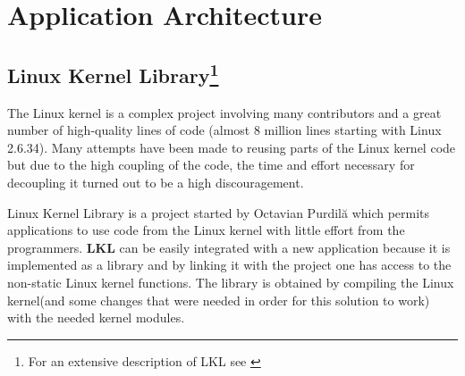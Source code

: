 \chapter{Application Architecture}
\label{chapter:arch}

\section[Linux Kernel Library]{Linux Kernel Library\footnote{For an extensive description of LKL see \cite{thesis}}}
\label{sec:lkl}

The Linux kernel is a complex project involving many contributors and a great number of high-quality lines 
of code (almost 8 million lines starting with Linux 2.6.34). Many attempts have been made to reusing parts of 
the Linux kernel code but due to the high coupling of the code, the time and effort necessary for decoupling 
it turned out to be a high discouragement. 

Linux Kernel Library is a project started by Octavian Purdil\u{a} which permits applications to use code from 
the Linux kernel with little effort from the programmers. \textbf{LKL} can be easily integrated with a new 
application because it is implemented as a library and by linking it with the project one has access to the 
non-static Linux kernel functions. The library is obtained by compiling the Linux kernel(and some changes that 
were needed in order for this solution to work) with the needed kernel modules. 

